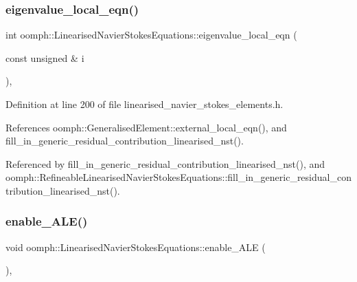 \mbox{\label{classoomph_1_1LinearisedNavierStokesEquations_a8c1fd588985991377b112c7535d35fa7}} 
\subsubsection{\texorpdfstring{eigenvalue\+\_\+local\+\_\+eqn()}{eigenvalue\_local\_eqn()}}
{\footnotesize\ttfamily int oomph\+::\+Linearised\+Navier\+Stokes\+Equations\+::eigenvalue\+\_\+local\+\_\+eqn (\begin{DoxyParamCaption}\item[{const unsigned \&}]{i }\end{DoxyParamCaption})\hspace{0.3cm}{\ttfamily [inline]}, {\ttfamily [protected]}}



Definition at line 200 of file linearised\+\_\+navier\+\_\+stokes\+\_\+elements.\+h.



References oomph\+::\+Generalised\+Element\+::external\+\_\+local\+\_\+eqn(), and fill\+\_\+in\+\_\+generic\+\_\+residual\+\_\+contribution\+\_\+linearised\+\_\+nst().



Referenced by fill\+\_\+in\+\_\+generic\+\_\+residual\+\_\+contribution\+\_\+linearised\+\_\+nst(), and oomph\+::\+Refineable\+Linearised\+Navier\+Stokes\+Equations\+::fill\+\_\+in\+\_\+generic\+\_\+residual\+\_\+contribution\+\_\+linearised\+\_\+nst().

\mbox{\label{classoomph_1_1LinearisedNavierStokesEquations_aa23576e22f4395af47adc54f6e5a11ad}} 
\subsubsection{\texorpdfstring{enable\+\_\+\+A\+L\+E()}{enable\_ALE()}}
{\footnotesize\ttfamily void oomph\+::\+Linearised\+Navier\+Stokes\+Equations\+::enable\+\_\+\+A\+LE (\begin{DoxyParamCaption}{ }\end{DoxyParamCaption})\hspace{0.3cm}{\ttfamily [inline]}, {\ttfamily [virtual]}}



